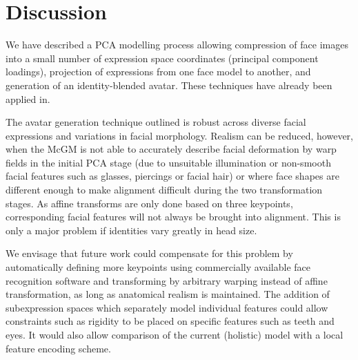 \documentclass[runningheads]{llncs}
\begin{document}
%	

\section{Discussion}

We have described a PCA modelling process allowing compression of face images into a small number of expression space coordinates (principal component loadings), projection of expressions from one face model to another, and generation of an identity-blended avatar. These techniques have already been applied in\cite{berisha2010identifying,berisha2009photorealistic,cook2011exploring,griffin2011relative}.



The avatar generation technique outlined is robust across diverse facial expressions and variations in facial morphology. Realism can be reduced, however, when the McGM is not able to accurately describe facial deformation by warp fields in the initial PCA stage (due to unsuitable illumination or non-smooth facial features such as glasses, piercings or facial hair) or where face shapes are different enough to make alignment difficult during the two transformation stages. As affine transforms are only done based on three keypoints, corresponding facial features will not always be brought into alignment. This is only a major problem if identities vary greatly in head size.

We envisage that future work could compensate for this problem by automatically defining more keypoints using commercially available face recognition software and transforming by arbitrary warping instead of affine transformation, as long as anatomical realism is maintained.
The addition of subexpression spaces which separately model individual features could allow constraints such as rigidity to be placed on specific features such as teeth and eyes. It would also allow comparison of the current (holistic) model with a local feature encoding scheme.
\end{document}
